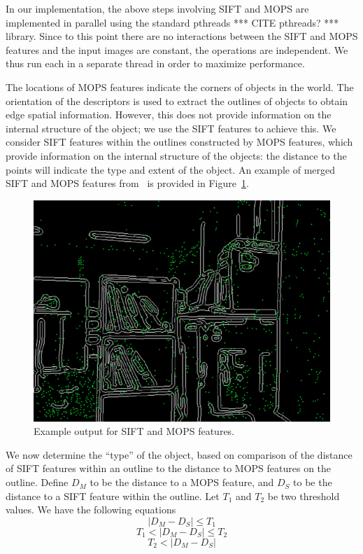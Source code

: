 \documentclass{acmsiggraph}
\begin{document}
In our implementation, the above steps involving SIFT and MOPS are implemented in parallel using the standard pthreads *** CITE pthreads? *** library. Since to this point there are no interactions between the SIFT and MOPS features and the input images are constant, the operations are independent. We thus run each in a separate thread in order to maximize performance.

The locations of MOPS features indicate the corners of objects in the world. The orientation of the descriptors is used to extract the outlines of objects to obtain edge spatial information. However, this does not provide information on the internal structure of the object; we use the SIFT features to achieve this. We consider SIFT features within the outlines constructed by MOPS features, which provide information on the internal structure of the objects: the distance to the points will indicate the type and extent of the object. An example of merged SIFT and MOPS features from~\cite{lee2011} is provided in Figure~\ref{fig:lee-sift-mops}.

\begin{figure}[h]
  \centering
  \includegraphics[resolution=150, scale=0.5]{images/lee-sift-mops-example}
  \caption{Example output for SIFT and MOPS features.}
  \label{fig:lee-sift-mops}
\end{figure}

We now determine the ``type'' of the object, based on comparison of the distance of SIFT features within an outline to the distance to MOPS features on the outline. Define $D_M$ to be the distance to a MOPS feature, and $D_S$ to be the distance to a SIFT feature within the outline. Let $T_1$ and $T_2$ be two threshold values. We have the following equations
\begin{equation}
  \label{eq:dist1}
  | D_M - D_S | \leq T_1
\end{equation}
\begin{equation}
  \label{eq:dist2}
  T_1 < | D_M - D_S | \leq T_2
\end{equation}
\begin{equation}
  \label{eq:dist3}
  T_2 < | D_M - D_S |
\end{equation}
\end{document}
